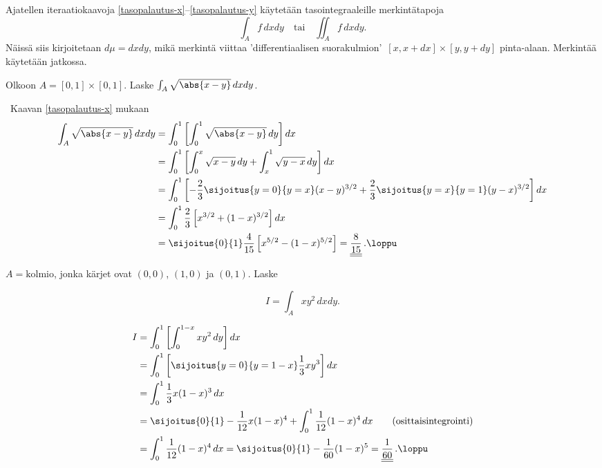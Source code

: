 Ajatellen iteraatiokaavoja \eqref{tasopalautus-x}--\eqref{tasopalautus-y} käytetään 
tasointegraaleille merkintätapoja
\[
\int_A f\, dxdy\quad\text{tai} \quad \iint_A f\, dxdy.
\]
Näissä siis kirjoitetaan $d\mu=dxdy$, mikä merkintä viittaa 'differentiaalisen suorakulmion' 
$\,[x,x+dx]\times[y,y+dy]$ pinta-alaan. Merkintää käytetään jatkossa.
\begin{Exa} Olkoon $A=[0,1]\times[0,1]$. Laske $\int_A \sqrt{\abs{x-y}}\,dxdy$. \end{Exa}
\ratk \ Kaavan \eqref{tasopalautus-x} mukaan
\begin{align*}
\int_A \sqrt{\abs{x-y}}\,dxdy 
&= \int_0^1 \left[ \int_0^1 \sqrt{\abs{x-y}}\,dy \right] dx \\
&= \int_0^1 \left[ \int_0^x \sqrt{x-y}\,dy + \int_x^1 \sqrt{y-x}\, dy \right] dx \\
&= \int_0^1 \left[ -\frac{2}{3}\sijoitus{y=0}{y=x} (x-y)^{3/2}
                   +\frac{2}{3}\sijoitus{y=x}{y=1} (y-x)^{3/2} \right] dx \\
&= \int_0^1 \frac{2}{3} \left[ x^{3/2}+(1-x)^{3/2} \right] dx \\
&= \sijoitus{0}{1} \frac{4}{15} \left[ x^{5/2}-(1-x)^{5/2} \right] 
 = \underline{\underline{\frac{8}{15}}}\,. \loppu
\end{align*}
\begin{Exa}
$A=\text{kolmio}$, jonka kärjet ovat $(0,0)$, $(1,0)$ ja $(0,1)$. Laske
\begin{multicols}{2} \raggedcolumns
\[
I=\int_A xy^2\,dxdy.
\]
\begin{figure}[H]
\begin{center}

\end{center}
\end{figure}
\end{multicols}
\end{Exa}
\ratk
\begingroup
\allowdisplaybreaks
\begin{align*}
I &= \int_0^1\left[\int_0^{1-x} xy^2\,dy\right] dx \\
  &= \int_0^1 \left[\sijoitus{y=0}{y=1-x} \frac{1}{3}xy^3\right] dx \\
  &= \int_0^1 \frac{1}{3}x(1-x)^3\,dx \\
  &= \sijoitus{0}{1} -\frac{1}{12}x(1-x)^4 + \int_0^1 \frac{1}{12}(1-x)^4\,dx
     \qquad \text{(osittaisintegrointi)} \\
  &= \int_0^1 \frac{1}{12}(1-x)^4\,dx = \sijoitus{0}{1} -\frac{1}{60}(1-x)^5
   = \underline{\underline{\frac{1}{60}}}\,. \loppu
\end{align*}%
